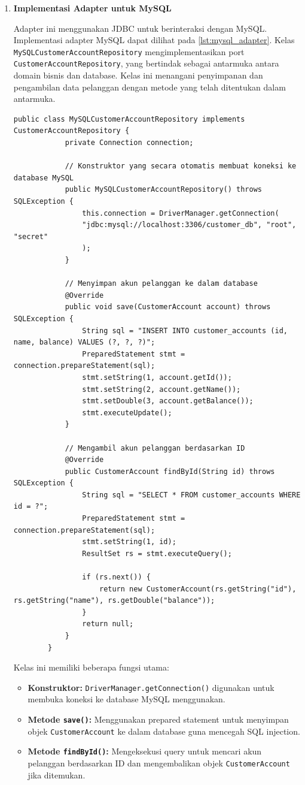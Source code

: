 \begin{enumerate}
	\item \textbf{Implementasi Adapter untuk MySQL}
	
	Adapter ini menggunakan JDBC untuk berinteraksi dengan MySQL. Implementasi adapter MySQL dapat dilihat pada \ref{lst:mysql_adapter}. Kelas \texttt{MySQLCustomerAccountRepository} mengimplementasikan port \texttt{CustomerAccountRepository}, yang bertindak sebagai antarmuka antara domain bisnis dan database. Kelas ini menangani penyimpanan dan pengambilan data pelanggan dengan metode yang telah ditentukan dalam antarmuka.
	
	\begin{lstlisting}[style=JavaStyle, caption=MySQL Adapter Implementation, label=lst:mysql_adapter]
		public class MySQLCustomerAccountRepository implements CustomerAccountRepository {
			private Connection connection;
			
			// Konstruktor yang secara otomatis membuat koneksi ke database MySQL
			public MySQLCustomerAccountRepository() throws SQLException {
				this.connection = DriverManager.getConnection(
				"jdbc:mysql://localhost:3306/customer_db", "root", "secret"
				);
			}
			
			// Menyimpan akun pelanggan ke dalam database
			@Override
			public void save(CustomerAccount account) throws SQLException {
				String sql = "INSERT INTO customer_accounts (id, name, balance) VALUES (?, ?, ?)";
				PreparedStatement stmt = connection.prepareStatement(sql);
				stmt.setString(1, account.getId());
				stmt.setString(2, account.getName());
				stmt.setDouble(3, account.getBalance());
				stmt.executeUpdate();
			}
			
			// Mengambil akun pelanggan berdasarkan ID
			@Override
			public CustomerAccount findById(String id) throws SQLException {
				String sql = "SELECT * FROM customer_accounts WHERE id = ?";
				PreparedStatement stmt = connection.prepareStatement(sql);
				stmt.setString(1, id);
				ResultSet rs = stmt.executeQuery();
				
				if (rs.next()) {
					return new CustomerAccount(rs.getString("id"), rs.getString("name"), rs.getDouble("balance"));
				}
				return null;
			}
		}
	\end{lstlisting}
	
	Kelas ini memiliki beberapa fungsi utama:
	\begin{itemize}
		\item \textbf{Konstruktor:} \texttt{DriverManager.getConnection()} digunakan untuk membuka koneksi ke database MySQL menggunakan.
		\item \textbf{Metode \texttt{save()}:} Menggunakan prepared statement untuk menyimpan objek \texttt{CustomerAccount} ke dalam database guna mencegah SQL injection.
		\item \textbf{Metode \texttt{findById()}:} Mengeksekusi query untuk mencari akun pelanggan berdasarkan ID dan mengembalikan objek \texttt{CustomerAccount} jika ditemukan.
	\end{itemize}
	

\end{enumerate}
